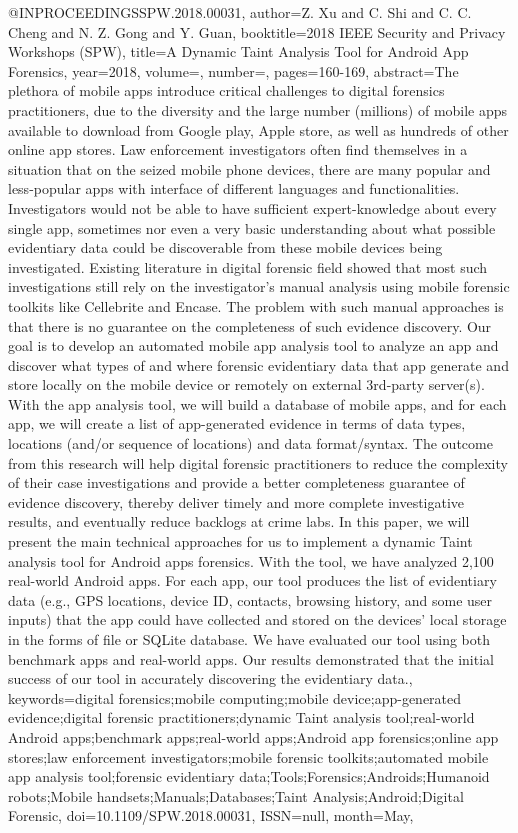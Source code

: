 @INPROCEEDINGS{SPW.2018.00031, 
author={Z. {Xu} and C. {Shi} and C. C. {Cheng} and N. Z. {Gong} and Y. {Guan}}, 
booktitle={2018 IEEE Security and Privacy Workshops (SPW)}, 
title={A Dynamic Taint Analysis Tool for Android App Forensics}, 
year={2018}, 
volume={}, 
number={}, 
pages={160-169}, 
abstract={The plethora of mobile apps introduce critical challenges to digital forensics practitioners, due to the diversity and the large number (millions) of mobile apps available to download from Google play, Apple store, as well as hundreds of other online app stores. Law enforcement investigators often find themselves in a situation that on the seized mobile phone devices, there are many popular and less-popular apps with interface of different languages and functionalities. Investigators would not be able to have sufficient expert-knowledge about every single app, sometimes nor even a very basic understanding about what possible evidentiary data could be discoverable from these mobile devices being investigated. Existing literature in digital forensic field showed that most such investigations still rely on the investigator's manual analysis using mobile forensic toolkits like Cellebrite and Encase. The problem with such manual approaches is that there is no guarantee on the completeness of such evidence discovery. Our goal is to develop an automated mobile app analysis tool to analyze an app and discover what types of and where forensic evidentiary data that app generate and store locally on the mobile device or remotely on external 3rd-party server(s). With the app analysis tool, we will build a database of mobile apps, and for each app, we will create a list of app-generated evidence in terms of data types, locations (and/or sequence of locations) and data format/syntax. The outcome from this research will help digital forensic practitioners to reduce the complexity of their case investigations and provide a better completeness guarantee of evidence discovery, thereby deliver timely and more complete investigative results, and eventually reduce backlogs at crime labs. In this paper, we will present the main technical approaches for us to implement a dynamic Taint analysis tool for Android apps forensics. With the tool, we have analyzed 2,100 real-world Android apps. For each app, our tool produces the list of evidentiary data (e.g., GPS locations, device ID, contacts, browsing history, and some user inputs) that the app could have collected and stored on the devices' local storage in the forms of file or SQLite database. We have evaluated our tool using both benchmark apps and real-world apps. Our results demonstrated that the initial success of our tool in accurately discovering the evidentiary data.}, 
keywords={digital forensics;mobile computing;mobile device;app-generated evidence;digital forensic practitioners;dynamic Taint analysis tool;real-world Android apps;benchmark apps;real-world apps;Android app forensics;online app stores;law enforcement investigators;mobile forensic toolkits;automated mobile app analysis tool;forensic evidentiary data;Tools;Forensics;Androids;Humanoid robots;Mobile handsets;Manuals;Databases;Taint Analysis;Android;Digital Forensic}, 
doi={10.1109/SPW.2018.00031}, 
ISSN={null}, 
month={May},}
